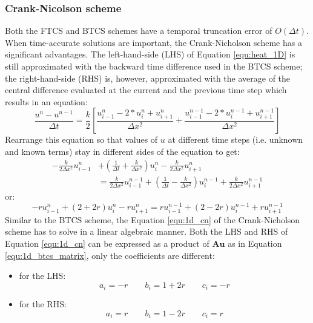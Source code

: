 \subsubsection{Crank-Nicolson scheme}
Both the FTCS and BTCS schemes have a temporal truncation error of $O(\Delta t)$. When time-accurate solutions are important, the Crank-Nicholson scheme has a significant advantages. The left-hand-side (LHS) of Equation \ref{equ:heat_1D} is still approximated with the backward time difference used in the BTCS scheme; the right-hand-side (RHS) is, however, approximated with the average of the central difference evaluated at the current and the previous time step which results in an equation:
\begin{equation}
	\frac{u^{n} - u^{n-1}}{\Delta t} = \frac{k}{2} \left[ \frac{u^{n}_{i-1} - 2*u^{n}_{i} + u^{n}_{i+1}}{\Delta x^2} + \frac{u^{n-1}_{i-1} - 2*u^{n-1}_{i} + u^{n-1}_{i+1}}{\Delta x^2} \right]
\end{equation}
Rearrange this equation so that values of $u$ at different time steps (i.e. unknown and known terms) stay in different sides of the equation to get:
\begin{align}
	-\frac{k}{2\Delta x^2} u^{n}_{i-1} &+ \left( \frac{1}{\Delta t} + \frac{k}{\Delta x^2} \right) u^{n}_{i} - \frac{k}{2\Delta x^2} u^{n}_{i+1} \nonumber \\
	&= \frac{k}{2\Delta x^2} u^{n-1}_{i-1} + \left( \frac{1}{\Delta t} - \frac{k}{\Delta x^2} \right) u^{n-1}_{i} + \frac{k}{2\Delta x^2} u^{n-1}_{i+1} \nonumber
\end{align}
or:
\begin{equation}
	-r u^{n}_{i-1} + \left( 2+2r \right) u^{n}_{i} - r u^{n}_{i+1} =
     r u^{n-1}_{i-1} + \left( 2-2r \right) u^{n-1}_{i} + r u^{n-1}_{i+1}
     \label{equ:1d_cn}
\end{equation}
Similar to the BTCS scheme, the Equation \ref{equ:1d_cn} of the Crank-Nicholson scheme has to solve in a linear algebraic manner. Both the LHS and RHS of Equation \ref{equ:1d_cn} can be expressed as a product of $\mathbf{A} \mathbf{u}$ as in Equation \ref{equ:1d_btcs_matrix}, only the coefficients are different:
\begin{itemize}
	\item for the LHS:
	\begin{equation}
		a_i = -r \quad \quad b_i = 1+2r \quad \quad c_i = -r
		\nonumber
	\end{equation}
	\item for the RHS:
	\begin{equation}
		a_i = r \quad \quad b_i = 1-2r \quad \quad c_i = r 
		\nonumber
	\end{equation}
\end{itemize} 



